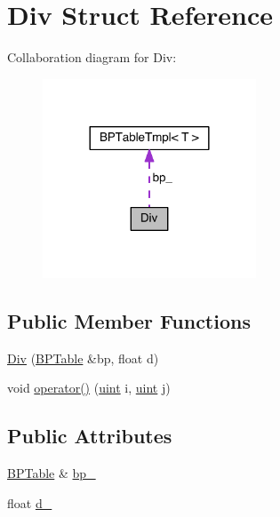 \hypertarget{struct_div}{\section{Div Struct Reference}
\label{struct_div}
}


Collaboration diagram for Div\+:
\nopagebreak
\begin{figure}[H]
\begin{center}
\leavevmode
\includegraphics[width=180pt]{struct_div__coll__graph}
\end{center}
\end{figure}
\subsection*{Public Member Functions}
\begin{DoxyCompactItemize}
\item 
\hyperlink{struct_div_a02dfa573214e834e934c49a9c114c333}{Div} (\hyperlink{folding__engine_8h_a065821fb17bbd8df315f2435c973e3c1}{B\+P\+Table} \&bp, float d)
\item 
void \hyperlink{struct_div_a32c6fd1ea5034e8951b713d0eff713df}{operator()} (\hyperlink{cyktable_8h_a91ad9478d81a7aaf2593e8d9c3d06a14}{uint} i, \hyperlink{cyktable_8h_a91ad9478d81a7aaf2593e8d9c3d06a14}{uint} j)
\end{DoxyCompactItemize}
\subsection*{Public Attributes}
\begin{DoxyCompactItemize}
\item 
\hyperlink{folding__engine_8h_a065821fb17bbd8df315f2435c973e3c1}{B\+P\+Table} \& \hyperlink{struct_div_af9fa7f70561254ba9fc9848442570cff}{bp\+\_\+}
\item 
float \hyperlink{struct_div_aa4f415b066d859ffeee86546aaffc6e8}{d\+\_\+}
\end{DoxyCompactItemize}


